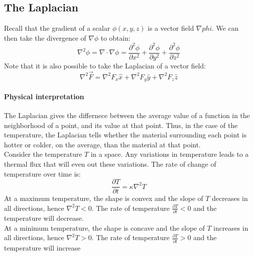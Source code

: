 \documentclass[11pt]{article}
\begin{document}
            \subsection{The Laplacian}\label{subsec:the-laplacian}
                Recall that the gradient of a scalar $\phi(x,y,z)$ is a vector field $\nabla phi$.
                We can then take the divergence of $\nabla \phi$ to obtain:
                \begin{equation}
                    \label{eq:equation6}
                    \nabla^2 \phi = \nabla \cdot \nabla \phi = \frac{\partial^2 \phi}{\partial x^2} + \frac{\partial^2 \phi}{\partial y^2} + \frac{\partial^2 \phi}{\partial z^2}
                \end{equation}
                Note that it is also possible to take the Laplacian of a vector field:
                \begin{equation}
                    \label{eq:equation7}
                    \nabla^2 \vec{F} = \nabla^2 F_x \hat{x} + \nabla^2 F_y \hat{y} + \nabla^2 F_z \hat{z}
                \end{equation}

                \paragraph{Physical interpretation} The Laplacian gives the differnece between the average value of a function
                in the neighborhood of a point, and its value at that point.
                Thus, in the case of the temperature, the Laplacian tells whether the material surrounding each point is hotter or colder,
                on the average, than the material at that point.\\
                Consider the temperature $T$ in a space.
                Any variations in temperature leads to a thermal flux that will even out these variations.
                The rate of change of temperature over time is:
                \begin{equation}
                    \label{eq:equation8}
                    \frac{\partial T}{\partial t} = \kappa \nabla^2 T
                \end{equation}
                At a maximum temperature, the shape is convex and the slope of $T$ decreases in all directions, hence
                $\nabla^2 T < 0$.
                The rate of temperature $\frac{\partial T}{\partial t} < 0$ and the temperature will decrease.\\
                At a minimum temperature, the shape is concave and the slope of $T$ increases in all directions, hence
                $\nabla^2 T > 0$.
                The rate of temperature $\frac{\partial T}{\partial t} > 0$ and the temperature will increase
\end{document}
